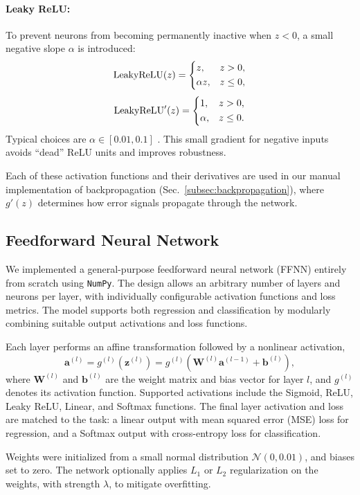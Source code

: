 \documentclass[amssymb,twocolumn,aps]{revtex4}
\begin{document}
\medskip
\paragraph{Leaky ReLU:}
To prevent neurons from becoming permanently inactive when $z<0$, a small
negative slope $\alpha$ is introduced:
\[
\mathrm{LeakyReLU}(z) =
\begin{dcases}
z, & z > 0,\\
\alpha z, & z \le 0,
\end{dcases}
\]
\[
\mathrm{LeakyReLU}'(z) =
\begin{dcases}
1, & z > 0,\\
\alpha, & z \le 0.
\end{dcases}
\]
Typical choices are $\alpha \in [0.01,0.1]$
\cite{goodfellow2016,hastie2025}.
This small gradient for negative inputs avoids ``dead'' ReLU units and
improves robustness.

\medskip
Each of these activation functions and their derivatives are used in our
manual implementation of backpropagation (Sec.~\ref{subsec:backpropagation}),
where $g'(z)$ determines how error signals propagate through the network.



\subsection{Feedforward Neural Network}
We implemented a general-purpose feedforward neural network (FFNN) entirely from scratch using \texttt{NumPy}\cite{numpy}. The design allows an arbitrary number of layers and neurons per layer, with individually configurable activation functions and loss metrics. The model supports both regression and classification by modularly combining suitable output activations and loss functions.

Each layer performs an affine transformation followed by a nonlinear activation,
\[
\mathbf{a}^{(l)} = g^{(l)}(\mathbf{z}^{(l)}) = g^{(l)}(\mathbf{W}^{(l)} \mathbf{a}^{(l-1)} + \mathbf{b}^{(l)}),
\]
where $\mathbf{W}^{(l)}$ and $\mathbf{b}^{(l)}$ are the weight matrix and bias vector for layer $l$, and $g^{(l)}$ denotes its activation function. Supported activations include the Sigmoid, ReLU, Leaky ReLU, Linear, and Softmax functions. The final layer activation and loss are matched to the task: a linear output with mean squared error (MSE) loss for regression, and a Softmax output with cross-entropy loss for classification.

Weights were initialized from a small normal distribution $\mathcal{N}(0, 0.01)$, and biases set to zero. The network optionally applies $L_1$ or $L_2$ regularization on the weights, with strength $\lambda$, to mitigate overfitting.
\end{document}
